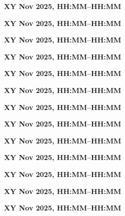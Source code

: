 \documentclass[12pt]{extbook}
\newcommand{\abstract}[2]{{
\bigskip
\begin{center}
\large\bfseries #1
\end{center}}
\par

\clearpage
}
\begin{document}
\abstract{XY Nov 2025, HH:MM--HH:MM}{abstracts/MoserRoeggla} %
\abstract{XY Nov 2025, HH:MM--HH:MM}{abstracts/Blanc} %
\abstract{XY Nov 2025, HH:MM--HH:MM}{abstracts/vanRooyen} %

\abstract{XY Nov 2025, HH:MM--HH:MM}{abstracts/Helbing} %
\abstract{XY Nov 2025, HH:MM--HH:MM}{abstracts/Peel} %
\abstract{XY Nov 2025, HH:MM--HH:MM}{abstracts/Brennwald} %

\abstract{XY Nov 2025, HH:MM--HH:MM}{abstracts/Bugher} %
\abstract{XY Nov 2025, HH:MM--HH:MM}{abstracts/Aardema} %


\abstract{XY Nov 2025, HH:MM--HH:MM}{abstracts/Seltzer} %
\abstract{XY Nov 2025, HH:MM--HH:MM}{abstracts/Coppens} %

\abstract{XY Nov 2025, HH:MM--HH:MM}{abstracts/Bekaert} %

\abstract{XY Nov 2025, HH:MM--HH:MM}{abstracts/Alshareef} %

\abstract{XY Nov 2025, HH:MM--HH:MM}{abstracts/MontoyaArevalo}
\end{document}
